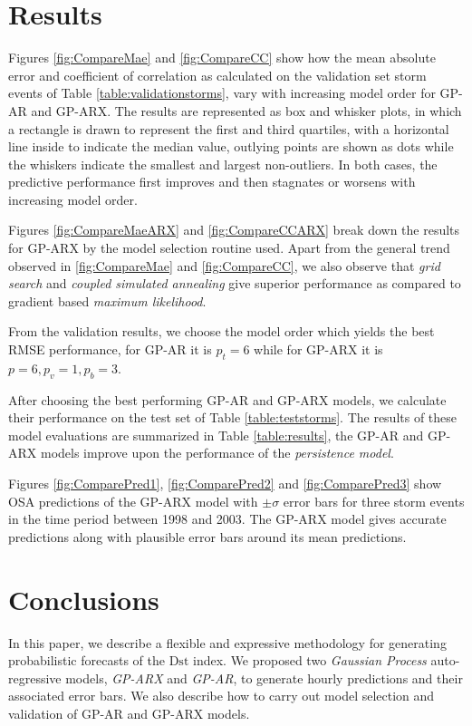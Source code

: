 \section{Results}\label{sec:res}

Figures \ref{fig:CompareMae} and \ref{fig:CompareCC} show how the mean absolute error and coefficient of correlation as calculated on the validation set storm events of Table \ref{table:validationstorms}, vary with increasing model order for GP-AR and GP-ARX. The results are represented as box and whisker plots, in which a rectangle is drawn to represent the first and third quartiles, with a horizontal line inside to indicate the median value, outlying points are shown as dots while the whiskers indicate the smallest and largest non-outliers. In both cases, the predictive performance first improves and then stagnates or worsens with increasing model order. 

Figures \ref{fig:CompareMaeARX} and \ref{fig:CompareCCARX} break down the results for GP-ARX by the model selection routine used. Apart from the general trend observed in \ref{fig:CompareMae} and \ref{fig:CompareCC}, we also observe that \emph{grid search} and \emph{coupled simulated annealing} give superior performance as compared to gradient based \emph{maximum likelihood}.

From the validation results, we choose the model order which yields the best RMSE performance, for GP-AR it is $p_t = 6$ while for GP-ARX it is $p = 6, p_v = 1, p_b = 3$.

After choosing the best performing GP-AR and GP-ARX models, we calculate their performance on the test set of Table \ref{table:teststorms}. The results of these model evaluations are summarized in Table \ref{table:results}, the GP-AR and GP-ARX models improve upon the performance of the \emph{persistence model}.

Figures \ref{fig:ComparePred1}, \ref{fig:ComparePred2} and \ref{fig:ComparePred3} show OSA predictions of the GP-ARX model with $\pm \sigma$ error bars for three storm events in the time period between 1998 and 2003. The GP-ARX model gives accurate predictions along with plausible error bars around its mean predictions.

\section{Conclusions}

In this paper, we describe a flexible and expressive methodology for generating probabilistic forecasts of the $ \mathrm{Dst}$ index. We proposed two \emph{Gaussian Process} auto-regressive models, \emph{GP-ARX} and \emph{GP-AR}, to generate hourly predictions and their associated error bars. We also describe how to carry out model selection and validation of GP-AR and GP-ARX models.


